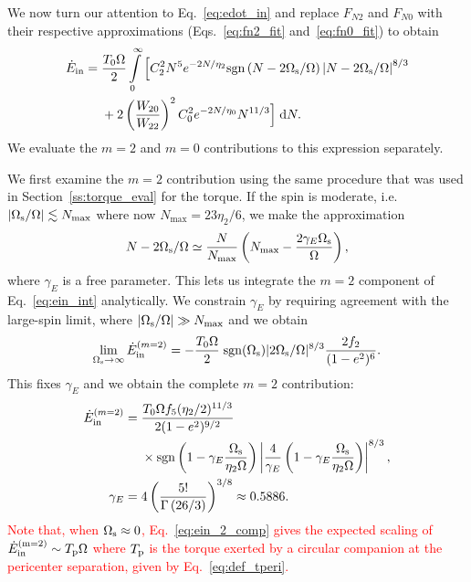 \documentclass[
        fleqn,
        usenatbib,
    ]{mnras}
\newcommand*{\abs}[1]{\left|#1\right|}
\newcommand*{\p}[1]{\left(#1\right)}
\begin{document}
We now turn our attention to Eq.~\eqref{eq:edot_in} and replace $F_{N2}$ and
$F_{N0}$ with their respective approximations (Eqs.~\ref{eq:fn2_fit}
and~\ref{eq:fn0_fit}) to obtain
\begin{align}
    \dot{E}_{\rm in} ={}&
        \frac{T_0 \Omega}{2} \int\limits_0^\infty \Big[
            C_2^2 N^5 e^{-2N/\eta_2} \mathrm{sgn}\left(N - 2\Omega_{\rm s} /
                \Omega\right) \left|N - 2 \Omega_{\rm s} /
                \Omega\right|^{8/3}\nonumber\\
            &+ 2 \p{\frac{W_{20}}{W_{22}}}^2 C_0^2 e^{-2N / \eta_0} N^{11/3}
        \Big]\;\mathrm{d}N.\label{eq:ein_int}
\end{align}
We evaluate the $m = 2$ and $m = 0$ contributions to this expression separately.

We first examine the $m = 2$ contribution using the same procedure that was used
in Section~\ref{ss:torque_eval} for the torque. If the spin is moderate,
i.e.\ $\abs{\Omega_{\rm s} / \Omega} \lesssim N_{\max}$ where now $N_{\max} = 23
\eta_2 / 6$, we make the approximation
\begin{equation}
    N - 2\Omega_{\rm s} / \Omega \simeq \frac{N}{N_{\max}}
        \left(N_{\max} - \frac{2\gamma_E
        \Omega_{\rm s}}{\Omega}\right)\label{eq:nmax_ansatz},
\end{equation}
where $\gamma_E$ is a free parameter. This lets us integrate the $m = 2$
component of Eq.~\eqref{eq:ein_int} analytically. We constrain $\gamma_E$
by requiring agreement with the large-spin limit, where $\abs{\Omega_{\rm s} /
\Omega} \gg N_{\max}$ and we obtain
\begin{equation}
    \lim_{\Omega_{\rm s} \to \infty} \dot{E}_{\rm in}^{(m=2)} =
        -\frac{T_0\Omega}{2} \; \mathrm{sgn}(\Omega_{\rm s})|2\Omega_{\rm
        s}/\Omega|^{8/3} \frac{2f_2}{(1 - e^2)^6}.\label{eq:ein_highs}
\end{equation}
This fixes $\gamma_E$ and we obtain the complete $m = 2$ contribution:
\begin{align}
    \dot{E}_{\rm in}^{(m=2)}
        ={}& \frac{T_0\Omega f_5 (\eta_2/2)^{11/3}}{2(1-e^2)^{9/2}}
            \nonumber\\
        &\times \mathrm{sgn}\p{1 - \gamma_E\frac{\Omega_{\rm s}}{\eta_2 \Omega}}
            \left|
                \frac{4}{\gamma_E}
                \p{1 - \gamma_E\frac{\Omega_{\rm s}}{\eta_2 \Omega}}
            \right|^{8/3}\label{eq:ein_2_comp},\\
    \gamma_E ={}& 4\p{\frac{5!}{\Gamma\p{26/3}}}^{3/8}
        \approx 0.5886.
\end{align}
\textcolor{red}{Note that, when $\Omega_{\rm s} \approx 0$,
Eq.~\eqref{eq:ein_2_comp} gives the expected scaling of $\dot{E}_{\rm in}^{\rm
(m=2)} \sim T_{\rm p}\Omega$ where $T_{\rm p}$ is the torque exerted by a
circular companion at the pericenter separation, given by
Eq.~\eqref{eq:def_tperi}.}
\end{document}
